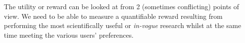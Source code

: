 



The utility or reward can be looked at from 2 (sometimes conflicting) points of view. We need to be able to measure a quantifiable reward resulting from performing the most scientifically useful or \emph{in-vogue} research whilst at the same time meeting the various users' preferences. %



